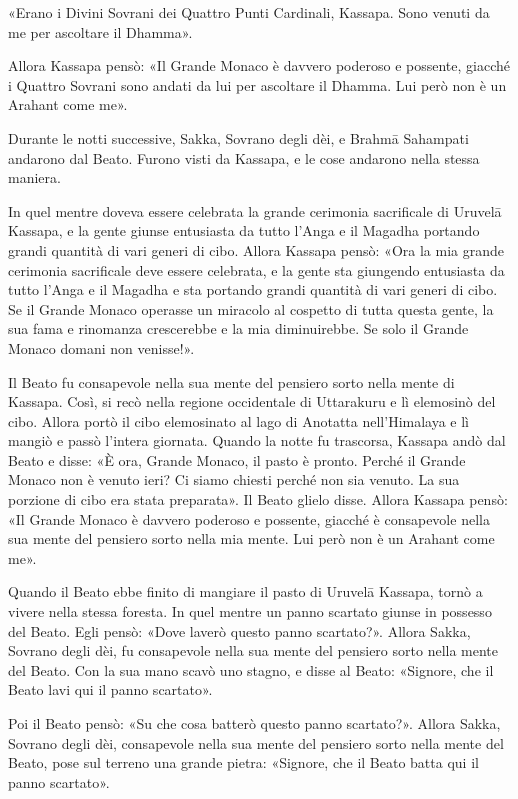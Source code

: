 «Erano i Divini Sovrani dei Quattro Punti Cardinali, Kassapa. Sono venuti da me
per ascoltare il Dhamma».

Allora Kassapa pensò: «Il Grande Monaco è davvero poderoso e possente, giacché i
Quattro Sovrani sono andati da lui per ascoltare il Dhamma. Lui però non è un
Arahant come me».

Durante le notti successive, Sakka, Sovrano degli dèi, e Brahmā Sahampati
andarono dal Beato. Furono visti da Kassapa, e le cose andarono nella stessa
maniera.

In quel mentre doveva essere celebrata la grande cerimonia sacrificale di
Uruvelā Kassapa, e la gente giunse entusiasta da tutto l’Anga e il Magadha
portando grandi quantità di vari generi di cibo. Allora Kassapa pensò: «Ora la
mia grande cerimonia sacrificale deve essere celebrata, e la gente sta giungendo
entusiasta da tutto l’Anga e il Magadha e sta portando grandi quantità di vari
generi di cibo. Se il Grande Monaco operasse un miracolo al cospetto di tutta
questa gente, la sua fama e rinomanza crescerebbe e la mia diminuirebbe. Se solo
il Grande Monaco domani non venisse!».

Il Beato fu consapevole nella sua mente del pensiero sorto nella mente di
Kassapa. Così, si recò nella regione occidentale di Uttarakuru e lì elemosinò
del cibo. Allora portò il cibo elemosinato al lago di Anotatta nell’Himalaya e
lì mangiò e passò l’intera giornata. Quando la notte fu trascorsa, Kassapa andò
dal Beato e disse: «È ora, Grande Monaco, il pasto è pronto. Perché il Grande
Monaco non è venuto ieri? Ci siamo chiesti perché non sia venuto. La sua
porzione di cibo era stata preparata». Il Beato glielo disse. Allora Kassapa
pensò: «Il Grande Monaco è davvero poderoso e possente, giacché è consapevole
nella sua mente del pensiero sorto nella mia mente. Lui però non è un Arahant
come me».

Quando il Beato ebbe finito di mangiare il pasto di Uruvelā Kassapa, tornò a
vivere nella stessa foresta. In quel mentre un panno scartato giunse in possesso
del Beato. Egli pensò: «Dove laverò questo panno scartato?». Allora Sakka,
Sovrano degli dèi, fu consapevole nella sua mente del pensiero sorto nella mente
del Beato. Con la sua mano scavò uno stagno, e disse al Beato: «Signore, che il
Beato lavi qui il panno scartato».

Poi il Beato pensò: «Su che cosa batterò questo panno scartato?». Allora Sakka,
Sovrano degli dèi, consapevole nella sua mente del pensiero sorto nella mente
del Beato, pose sul terreno una grande pietra: «Signore, che il Beato batta qui
il panno scartato».

